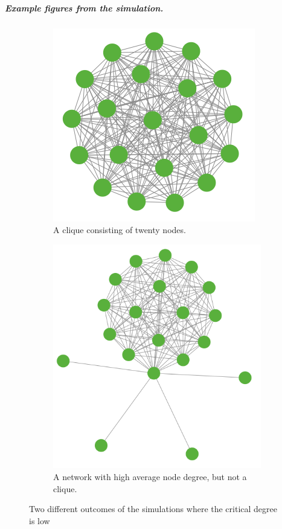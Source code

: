 \subparagraph{Example figures from the simulation.}
\begin{figure}[h]
\centering
\begin{subfigure}{.9\textwidth}
  \centering
  \includegraphics[width=0.7\linewidth]{../Figures/Clique-20-nodes.png}
  \caption{\label{fig:discountclique} A clique consisting of twenty nodes. }
\end{subfigure}
\quad
\begin{subfigure}{.9\textwidth}
  \centering
  \includegraphics[width=0.7\linewidth]{../Figures/Clique-ish-20-nodes.png}
  \caption{\label{fig:discountbaloon} A network with high average node degree, but not a clique.}
\end{subfigure}
\caption{\label{fig:discounthighdegree} Two different outcomes of the simulations where the critical degree is low}
\end{figure}
